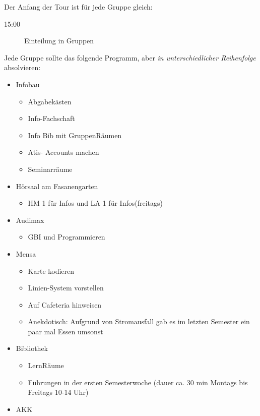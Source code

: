 \documentclass[10pt,twocolumn,ngerman]{scrartcl}
\begin{document}
Der Anfang der Tour ist für jede Gruppe gleich:
\begin{description}
    \item [{15:00}] Einteilung in Gruppen\setlength{\itemsep}{0pt}
\end{description}
Jede Gruppe sollte das folgende Programm, aber \emph{in unterschiedlicher Reihenfolge} absolvieren:
\begin{itemize}
    \item Infobau
        \begin{itemize}
            \item Abgabekästen
            \item Info-Fachschaft
            \item Info Bib mit GruppenRäumen
            \item Atis- Accounts machen
            \item Seminarräume
        \end{itemize}
    \item Hörsaal am Fasanengarten
        \begin{itemize}
            \item HM 1 für Infos und LA 1 für Infos(freitags)
        \end{itemize}
    \item Audimax
        \begin{itemize}
            \item GBI und Programmieren
        \end{itemize}
    \item Mensa
        \begin{itemize}
            \item Karte kodieren
            \item Linien-System vorstellen
            \item Auf Cafeteria hinweisen
            \item Anekdotisch: Aufgrund von Stromausfall gab es im letzten Semester ein paar mal Essen umsonst
        \end{itemize}
    \item Bibliothek
        \begin{itemize}
            \item LernRäume
            \item Führungen in der ersten Semesterwoche (dauer ca. 30 min Montags bis Freitags 10-14 Uhr)
        \end{itemize}
    \item AKK
        \begin{itemize}

\end{itemize}
\end{itemize}
\end{document}
